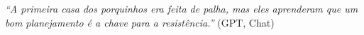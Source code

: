 
\begin{epigrafe}

    \textit{``A primeira casa dos porquinhos era feita de palha, mas eles aprenderam que um bom planejamento é a chave para a resistência.''}
    (GPT, Chat)

\end{epigrafe}
